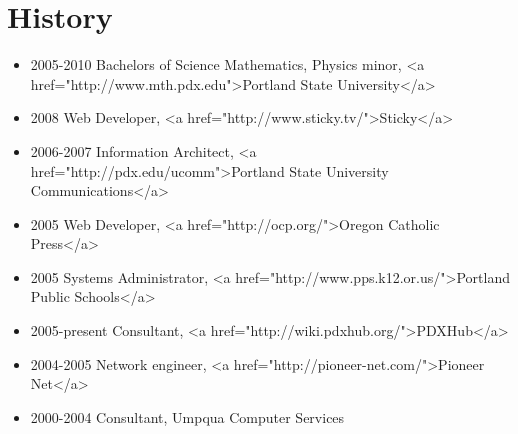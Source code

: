 \documentclass[a4paper,12pt,openany,oneside]{memoir}
\newlength{\myindent}
\newenvironment{myul}%
    {\begin{itemize} [topsep=0pt, partopsep=0pt, itemsep=0pt, %
     parsep=\parskip, leftmargin=\myindent, labelindent=1.0pt, %
     labelsep=*, label={\rule[0.2ex]{0.7ex}{0.7ex}}]}%
    {\end{itemize} \vspace{0ex} }
\begin{document}
\chapter{History}

\begin{myul}
\item 2005-2010 Bachelors of Science Mathematics, Physics minor, <a href="http://www.mth.pdx.edu">Portland State University</a>
\item 2008 Web Developer, <a href="http://www.sticky.tv/">Sticky</a>
\item 2006-2007 Information Architect, <a href="http://pdx.edu/ucomm">Portland State University Communications</a>
\item 2005 Web Developer, <a href="http://ocp.org/">Oregon Catholic Press</a>
\item 2005 Systems Administrator, <a href="http://www.pps.k12.or.us/">Portland Public Schools</a>
\item 2005-present Consultant, <a href="http://wiki.pdxhub.org/">PDXHub</a>
\item 2004-2005 Network engineer, <a href="http://pioneer-net.com/">Pioneer Net</a>
\item 2000-2004 Consultant, Umpqua Computer Services
\end{myul}
\end{document}
